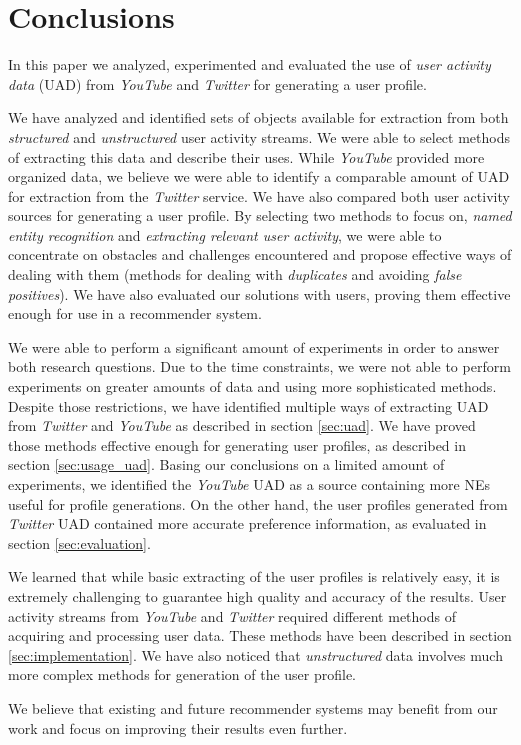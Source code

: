 \section{Conclusions}
\label{sec:conclusion}

In this paper we analyzed, experimented and evaluated the use of \textit{user activity data} (UAD) from \textit{YouTube}
and \textit{Twitter} for generating a user profile.

We have analyzed and identified sets of objects available for extraction from both \textit{structured} and
\textit{unstructured} user activity streams. We were able to select methods of extracting this data and describe
their uses. While \textit{YouTube} provided more organized data, we believe we were able to identify a comparable
amount of UAD for extraction from the \textit{Twitter} service.
We have also compared both user activity sources for generating a user profile. By selecting two methods to focus
on, \ie \textit{named entity recognition} and \textit{extracting relevant user activity}, we were able to concentrate
on obstacles and challenges encountered and propose effective ways of dealing with them (\ie methods for dealing with
\textit{duplicates} and avoiding \textit{false positives}). We have also evaluated our solutions with users, proving
them effective enough for use in a recommender system.

We were able to perform a significant amount of experiments in order to answer both research questions. Due to the time
constraints, we were not able to perform experiments on greater amounts of data and using more sophisticated methods.
Despite those restrictions, we have identified multiple ways of extracting UAD from \textit{Twitter} and \textit{YouTube}
as described in section \ref{sec:uad}. We have proved those methods effective enough for generating user profiles, as
described in section \ref{sec:usage_uad}. Basing our conclusions on a limited amount of experiments, we identified
the \textit{YouTube} UAD as a source containing more NEs useful for profile generations. On the other hand, the
user profiles generated from \textit{Twitter} UAD contained more accurate preference information, as evaluated in section
\ref{sec:evaluation}.

We learned that while basic extracting of the user profiles is relatively easy, it is extremely challenging to
guarantee high quality and accuracy of the results. User activity streams from \textit{YouTube} and \textit{Twitter}
required different methods of acquiring and processing user data. These methods have been described in section
\ref{sec:implementation}. We have also noticed that \textit{unstructured} data involves much more complex methods
for generation of the user profile.

We believe that existing and future recommender systems may benefit from our work and focus on improving their results
even further.